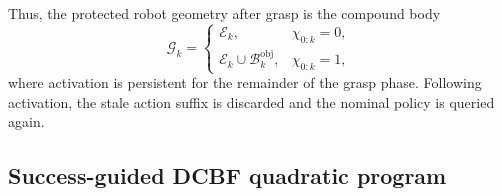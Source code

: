 Thus, the protected robot geometry after grasp is the compound body
\begin{equation}
    \mathcal{G}_k
    =
    \begin{cases}
        \mathcal{E}_k, & \chi_{0:k}=0,\\
        \mathcal{E}_k\cup\mathcal{B}^{\mathrm{obj}}_k, & \chi_{0:k}=1,
    \end{cases}
\end{equation}
where activation is persistent for the remainder of the grasp phase. Following activation, the stale action suffix is discarded and the nominal policy is queried again.

\subsection{Success-guided DCBF quadratic program}

